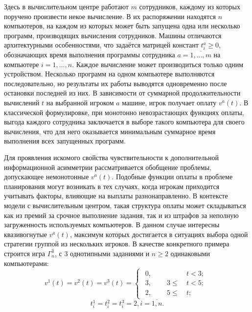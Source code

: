 Здесь в вычислительном центре работают $m$ сотрудников, каждому из которых поручено произвести некое вычисление. В их распоряжении находятся $n$ компьютеров, на каждом из которых может быть запущена одна или несколько программ, производящих вычисления сотрудников. Машины отличаются архитектурными особенностями, что задаётся матрицей констант $t_i^a \ge 0$, обозначающих время выполнения программы сотрудника $a=\overline{1,\ldots,m}$ на компьютере $i=\overline{1,\ldots,n}$. Каждое вычисление может производиться только одним устройством. Несколько программ на одном компьютере выполняются последовательно, но результаты их работы выводятся одновременно после остановки последней из них. В зависимости от суммарной продолжительности вычислений $t$ на выбранной игроком $a$ машине, игрок получает оплату $v^a(t)$. В классической формулировке, при монотонно невозрастающих функциях оплаты, выгода каждого сотрудника заключается в выборе такого компьютера для своего вычисления, что для него оказывается минимальным суммарное время выполнения всех запущенных программ.

Для проявления искомого свойства чувствительности к дополнительной информационной асимметрии рассматривается обобщение проблемы, допускающее немонотонные $v^a(t)$. Подобные функции оплаты в проблеме планирования могут возникать в тех случаях, когда игрокам приходится учитывать факторы, влияющие на выплаты разнонаправленно. В контексте модели с вычислительным центром, такая структура оплаты может складываться как из премий за срочное выполнение задания, так и из штрафов за неполную загруженность используемых компьютеров. В данном случае интересны квазивогнутые $v^a(t)$, максимум которых достигается в ситуациях выбора одной стратегии группой из нескольких игроков. В качестве конкретного примера строится игра $\Gamma^3_n$, с $3$ однотипными заданиями и $n \ge 2$ одинаковыми компьютерами:
\begin{equation*}
	v^1(t) = v^2(t) = v^3(t) = \begin{cases}
		\begin{aligned}
			0, \qquad\qquad & \ t < 3 ;\\
			3, \qquad\ 3 \le & \ t < 5 ;\\
			2, \qquad\ 5 \le & \ t ;
		\end{aligned}
	\end{cases}
\end{equation*}
\begin{equation*}
	t_i^1 = t_i^2 = t_i^3 = 2, i = \overline{1,n}.
\end{equation*}

